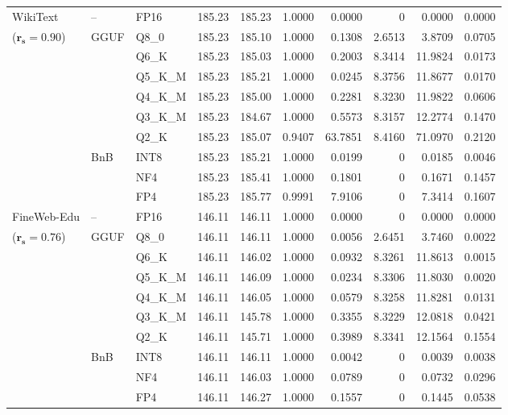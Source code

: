 \begin{longtable}{ll l rrrrrrr}
\midrule
WikiText & -- & FP16 & 185.23 & 185.23 & 1.0000 & 0.0000 & \cellcolor{cyan!12} $0$ & 0.0000 & 0.0000 \\
{\small ($\mathbf{r_s{=}0.90}$)} & GGUF & Q8\_0 & 185.23 & 185.10 & 1.0000 & 0.1308 & 2.6513 & 3.8709 & 0.0705 \\
 &  & Q6\_K & 185.23 & 185.03 & 1.0000 & 0.2003 & 8.3414 & 11.9824 & 0.0173 \\
 &  & Q5\_K\_M & 185.23 & 185.21 & 1.0000 & 0.0245 & 8.3756 & 11.8677 & 0.0170 \\
 &  & Q4\_K\_M & 185.23 & 185.00 & 1.0000 & 0.2281 & 8.3230 & 11.9822 & 0.0606 \\
 &  & Q3\_K\_M & 185.23 & 184.67 & 1.0000 & 0.5573 & 8.3157 & 12.2774 & 0.1470 \\
 &  & Q2\_K & 185.23 & 185.07 & \cellcolor{red!18} 0.9407 & \cellcolor{red!18} 63.7851 & 8.4160 & \cellcolor{red!18} 71.0970 & \cellcolor{red!18} 0.2120 \\
 & BnB & INT8 & 185.23 & 185.21 & 1.0000 & 0.0199 & \cellcolor{cyan!12} $0$ & 0.0185 & 0.0046 \\
 &  & NF4 & 185.23 & 185.41 & 1.0000 & 0.1801 & \cellcolor{cyan!12} $0$ & 0.1671 & 0.1457 \\
 &  & FP4 & 185.23 & 185.77 & 0.9991 & 7.9106 & \cellcolor{cyan!12} $0$ & 7.3414 & 0.1607 \\
\midrule
FineWeb-Edu & -- & FP16 & 146.11 & 146.11 & 1.0000 & 0.0000 & \cellcolor{cyan!12} $0$ & 0.0000 & 0.0000 \\
{\small ($\mathbf{r_s{=}0.76}$)} & GGUF & Q8\_0 & 146.11 & 146.11 & 1.0000 & 0.0056 & 2.6451 & 3.7460 & 0.0022 \\
 &  & Q6\_K & 146.11 & 146.02 & 1.0000 & 0.0932 & 8.3261 & 11.8613 & 0.0015 \\
 &  & Q5\_K\_M & 146.11 & 146.09 & 1.0000 & 0.0234 & 8.3306 & 11.8030 & 0.0020 \\
 &  & Q4\_K\_M & 146.11 & 146.05 & 1.0000 & 0.0579 & 8.3258 & 11.8281 & 0.0131 \\
 &  & Q3\_K\_M & 146.11 & 145.78 & 1.0000 & 0.3355 & 8.3229 & 12.0818 & 0.0421 \\
 &  & Q2\_K & 146.11 & 145.71 & 1.0000 & 0.3989 & 8.3341 & 12.1564 & 0.1554 \\
 & BnB & INT8 & 146.11 & 146.11 & 1.0000 & 0.0042 & \cellcolor{cyan!12} $0$ & 0.0039 & 0.0038 \\
 &  & NF4 & 146.11 & 146.03 & 1.0000 & 0.0789 & \cellcolor{cyan!12} $0$ & 0.0732 & 0.0296 \\
 &  & FP4 & 146.11 & 146.27 & 1.0000 & 0.1557 & \cellcolor{cyan!12} $0$ & 0.1445 & 0.0538 \\
\end{longtable}
\endgroup